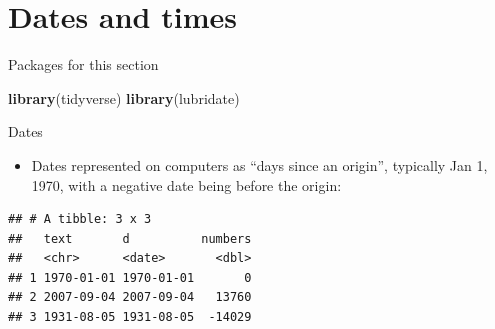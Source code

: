 \documentclass[ignorenonframetext,]{beamer}
\newenvironment{Shaded}{\begin{snugshade}}{\end{snugshade}}
\newcommand{\DataTypeTok}[1]{\textcolor[rgb]{0.13,0.29,0.53}{#1}}
\newcommand{\KeywordTok}[1]{\textcolor[rgb]{0.13,0.29,0.53}{\textbf{#1}}}
\newcommand{\NormalTok}[1]{#1}
\newcommand{\OperatorTok}[1]{\textcolor[rgb]{0.81,0.36,0.00}{\textbf{#1}}}
\newcommand{\StringTok}[1]{\textcolor[rgb]{0.31,0.60,0.02}{#1}}
\providecommand{\tightlist}{%
  \setlength{\itemsep}{0pt}\setlength{\parskip}{0pt}}
\begin{document}
\hypertarget{dates-and-times}{%
\section{Dates and times}\label{dates-and-times}}

\begin{frame}[fragile]{Packages for this section}
\protect\hypertarget{packages-for-this-section-9}{}

\begin{Shaded}
\begin{Highlighting}[]
\KeywordTok{library}\NormalTok{(tidyverse)}
\KeywordTok{library}\NormalTok{(lubridate)}
\end{Highlighting}
\end{Shaded}

\end{frame}

\begin{frame}[fragile]{Dates}
\protect\hypertarget{dates}{}

\begin{itemize}
\tightlist
\item
  Dates represented on computers as ``days since an origin'', typically
  Jan 1, 1970, with a negative date being before the origin:
\end{itemize}

\begin{Shaded}
\end{Shaded}

\begin{verbatim}
## # A tibble: 3 x 3
##   text       d          numbers
##   <chr>      <date>       <dbl>
## 1 1970-01-01 1970-01-01       0
## 2 2007-09-04 2007-09-04   13760
## 3 1931-08-05 1931-08-05  -14029
\end{verbatim}

\end{frame}
\end{document}
